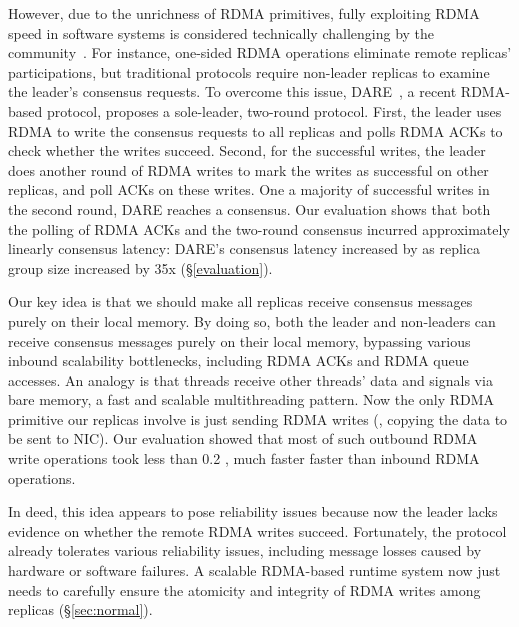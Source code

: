 However, due to the unrichness of RDMA primitives, fully exploiting RDMA 
speed in software systems is considered technically challenging by the 
community~\cite{pilaf:usenix14,herd:sigcomm14,dare:hpdc15,farm:sosp15}. For 
instance, one-sided RDMA operations eliminate remote replicas' participations, 
but traditional \paxos protocols require non-leader replicas to examine the 
leader's consensus requests. To overcome this issue, DARE~\cite{dare:hpdc15}, a 
recent RDMA-based \paxos protocol, proposes a sole-leader, two-round protocol. 
First, the leader uses RDMA to write the consensus requests to all replicas and 
polls RDMA ACKs to check whether the writes succeed. Second, for the successful 
writes, the leader does another round of RDMA writes to mark the writes as 
successful on other replicas, and poll ACKs on these writes. One a majority of 
successful writes in the second round, DARE reaches a consensus. Our evaluation 
shows that both the polling of RDMA ACKs and the two-round consensus incurred 
approximately linearly consensus latency: DARE's consensus latency increased by 
\darescalability as replica group size increased by 35x (\S\ref{evaluation}).

Our key idea is that we should make all \paxos replicas receive consensus 
messages purely on their local memory. By doing so, both the leader and 
non-leaders can receive consensus messages purely on their local memory, 
bypassing various inbound scalability bottlenecks, including RDMA ACKs and RDMA 
queue accesses. An analogy is that threads receive other threads' data and 
signals via bare memory, a fast and scalable multithreading pattern. Now the 
only RDMA primitive our \paxos replicas involve is just sending RDMA writes 
(\ie, copying the data to be sent to NIC). Our evaluation showed that 
most of such outbound RDMA write operations took less than 0.2 \us, much faster 
faster than inbound RDMA operations.

In deed, this idea appears to pose reliability issues because now the leader 
lacks evidence on whether the remote RDMA writes succeed. Fortunately, the 
\paxos protocol already tolerates various reliability issues, including message 
losses caused by hardware or software failures. A scalable RDMA-based \paxos 
runtime system now just needs to carefully ensure the atomicity and integrity 
of RDMA writes among replicas (\S\ref{sec:normal}).



